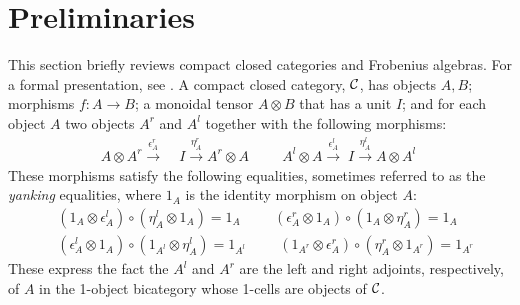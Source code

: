 
\section{Preliminaries}
\label{prelim}


This section briefly reviews compact closed
categories and Frobenius algebras. For a formal presentation, see
\cite{KellyLaplaza80,Kock72}.  A compact closed category, $\mathcal{C}$, has objects $A, B$; morphisms $f \colon A
\to B$; a monoidal tensor $A \otimes B$ that has a unit $I$; and for
each object $A$ two objects $A^r$ and $A^l$ together with the
following morphisms:
\begin{align*}
A \otimes A^r \stackrel{\epsilon_A^r} {\longrightarrow} \; &I
\stackrel{\eta_A^r}{\longrightarrow} A^r \otimes A \hspace{1cm}
A^l \otimes A \stackrel{\epsilon_A^l}{\longrightarrow} \; I
\stackrel{\eta_A^l}{\longrightarrow} A \otimes A^l\
\end{align*}
These morphisms satisfy the following equalities, sometimes
referred to as the \emph{yanking} equalities, where $1_A$ is the
identity morphism on object $A$:
\begin{align*}
& (1_A \otimes \epsilon_A^l) \circ (\eta_A^l \otimes 1_A)  = 1_A 
\hspace{1cm}
(\epsilon_A^r \otimes 1_A) \circ (1_A \otimes
  \eta_A^r)   = 1_A\\
& (\epsilon_A^l \otimes 1_A) \circ (1_{A^l} \otimes
  \eta_A^l) = 1_{A^l}  
    \hspace{1cm}
    (1_{A^r} \otimes \epsilon_A^r) \circ (\eta_A^r \otimes 1_{A^r}) = 1_{A^r}
\end{align*}
%
\noindent These express the fact the $A^l$ and $A^r$ are the left and right
adjoints, respectively, of $A$ in the 1-object bicategory whose
1-cells are objects of $\mathcal{C}$.


